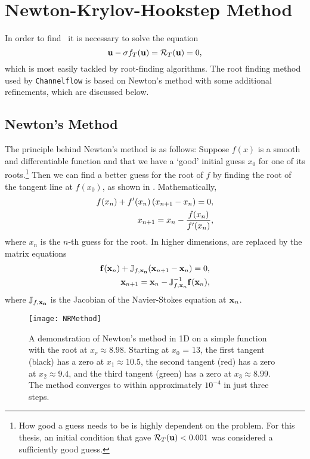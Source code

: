 \section{Newton-Krylov-Hookstep Method}

In order to find \ecs\, it is necessary to solve the equation
\begin{equation}\label{eq:NRResidual}
\mathbf{u} - \sigma f_T(\mathbf{u}) = \mathcal{R}_T(\mathbf{u}) = 0,
\end{equation}
which is most easily tackled by root-finding algorithms. The root finding method used by {\tt Channelflow} is based on Newton's method with some additional refinements, which are discussed below. \\
\subsection{Newton's Method}
The principle behind Newton's method is as follows: Suppose  $f(x)$ is a smooth and differentiable function and that we have a `good' initial guess $x_0$ for one of its roots.\footnote{How good a guess needs to be is highly dependent on the problem. For this thesis, an initial condition that gave $\mathcal{R}_T(\mathbf{u}) < 0.001$ was considered a sufficiently good guess.}  Then we can find a better guess for the root of $f$ by finding the root of the tangent line at $f(x_0)$, as shown in . Mathematically, 
\begin{align}
f(x_n) + f'(x_n)\left ( x_{n+1} - x_n \right ) = 0,\label{eq:NRS1D}\\ 
x_{n+1} = x_n - \dfrac{f(x_n)}{f'(x_n)},\label{eq:NR1D}
\end{align}
where $x_n$ is the $n$-th guess for the root. In higher dimensions,  are replaced by the matrix equations
\begin{align}
\mathbf{f}(\mathbf{x}_n) + \mathbb{J}_{f,\mathbf{x_n}}(\mathbf{x}_{n+1} - \mathbf{x}_n) = 0,\label{eq:NRSND}\\
\mathbf{x}_{n+1} = \mathbf{x}_n - \mathbb{J}_{f,\mathbf{x}_n}^{-1}\mathbf{f}(\mathbf{x}_n),
\end{align}
where $\mathbb{J}_{f,\mathbf{x_n}}$ is the Jacobian of the Navier-Stokes equation at $\mathbf{x}_n$.\\

\begin{figure}[h]
\texttt{[image: NRMethod]}
\caption{A demonstration of Newton's method in 1D on a simple function with the root at $x_r \approx 8.98$. Starting at $x_0$ = 13, the first tangent (black) has a zero at $x_1 \approx 10.5$, the second tangent (red) has a zero at $x_2 \approx 9.4$, and the third tangent (green) has a zero at $x_3 \approx 8.99$. The method converges to within approximately $10^{-4}$ in just three steps.}\label{fig:Newton}
\end{figure}  

